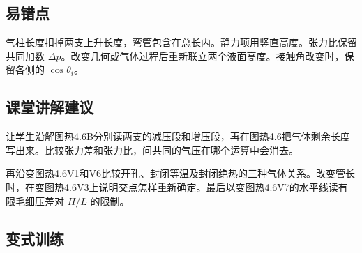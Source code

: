 \documentclass[UTF8,fontset=fandol,a4paper,11pt]{ctexart}
\begin{document}


\subsection*{易错点}

气柱长度扣掉两支上升长度，弯管包含在总长内。静力项用竖直高度。张力比保留共同加数 $\Delta p$。改变几何或气体过程后重新联立两个液面高度。接触角改变时，保留各侧的 $\cos\theta_i$。



\subsection*{课堂讲解建议}

让学生沿解图热4.6B分别读两支的减压段和增压段，再在图热4.6把气体剩余长度写出来。比较张力差和张力比，问共同的气压在哪个运算中会消去。

再沿变图热4.6V1和V6比较开孔、封闭等温及封闭绝热的三种气体关系。改变管长时，在变图热4.6V3上说明交点怎样重新确定。最后以变图热4.6V7的水平线读有限毛细压差对 $H/L$ 的限制。



\subsection*{变式训练}
\end{document}
